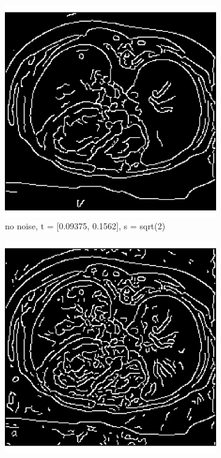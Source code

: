 \begin{figure}[H]
  \centering
  
  \begin{subfigure}{.5\textwidth}
    \centering
    \includegraphics[width=.9\textwidth]{./canny1/no_noise_t_009375_01562}
    \caption{no noise, t = [0.09375, 0.1562], s = sqrt(2)}
    \label{fig:cany_no_noise_high_low_t}
  \end{subfigure}%
  \begin{subfigure}{.5\textwidth}
    \centering
    \includegraphics[width=.9\textwidth]{./canny1/no_noise_t_00625_00781}

\end{subfigure}
\end{figure}
